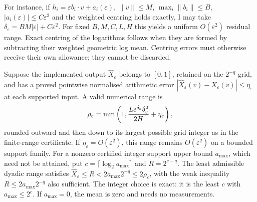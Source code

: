 For instance, if $h_i=\varepsilon b_i\cdot v+a_i(\varepsilon)$,
$\|v\|\leq M$, $\max_i\|b_i\|\leq B$,
$|a_i(\varepsilon)|\leq C\varepsilon^2$ and the weighted centring
holds exactly, I may take
$\delta_\varepsilon=BM|\varepsilon|+C\varepsilon^2$.
For fixed $B,M,C,L,H$ this yields a uniform $O(\varepsilon^2)$
residual range. Exact centring of the logarithms follows when they are
formed by subtracting their weighted geometric log mean. Centring errors
must otherwise receive their own allowance; they cannot be discarded.

Suppose the implemented output $\widehat X_\varepsilon$ belongs to $[0,1]$,
retained on the $2^{-q}$ grid, and has a proved pointwise normalised
arithmetic error $|\widehat X_\varepsilon(v)-X_\varepsilon(v)|\leq\eta_\varepsilon$ at each supported input. A valid numerical range is
\[
 \rho_\varepsilon=\min\left(1,
 {L e^{\delta_\varepsilon}\delta_\varepsilon^2\over2H}
                  +\eta_\varepsilon\right),
\]
rounded outward and then down to its largest possible grid integer as in
the finite-range certificate. If $\eta_\varepsilon=O(\varepsilon^2)$,
this range remains $O(\varepsilon^2)$ on a bounded support family.
For a nonzero certified integer support upper bound $a_{\max}$, which need not be attained, put
$c=\lceil\log_2 a_{\max}\rceil$ and $R=2^{c-q}$.
The least admissible dyadic range satisfies
$\widehat X_\varepsilon\leq R<2a_{\max}2^{-q}\leq2\rho_\varepsilon$,
with the weak inequality $R\leq2a_{\max}2^{-q}$ also sufficient.
The integer choice is exact: it is the least $c$ with $a_{\max}\leq2^c$.
If $a_{\max}=0$, the mean is zero and needs no measurements.

